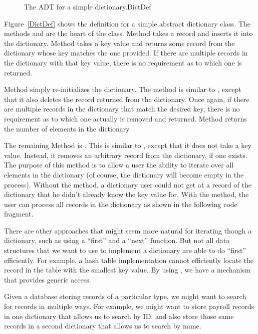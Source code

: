 \begin{figure}

{The ADT for a simple dictionary.}{DictDef}
\end{figure}

Figure~\ref{DictDef} shows the definition for a simple abstract
dictionary class.
The methods  and  are the heart of the
class.
Method  takes a record and
inserts it into the dictionary.
Method  takes a key value and returns some record from
the dictionary whose key matches the one provided.
If there are multiple records in the dictionary with that key value,
there is no requirement as to which one is returned.

Method  simply re-initializes the dictionary.
The  method is similar to , except that it
also deletes the record returned from the dictionary.
Once again, if there are multiple records in the dictionary that match
the desired key, there is no requirement as to which one actually is
removed and returned.
Method  returns the number of elements in the
dictionary.

The remaining Method is .
This is similar to , except that it does not take a key
value.
Instead, it removes an arbitrary record from the dictionary, if one
exists.
The purpose of this method is to allow a user the ability to iterate 
over all elements in the dictionary (of course, the dictionary will
become empty in the process).
Without the  method, a dictionary user could not get
at a record of the dictionary that he didn't already know the key
value for.
With the  method, the user can process all records
in the dictionary as shown in the following code fragment.


There are other approaches that might seem more natural for iterating
though a dictionary, such as using a ``first'' and a ``next'' function.
But not all data structures that we want to use to implement a
dictionary are able to do ``first'' efficiently.
For example, a hash table implementation cannot efficiently locate the
record in the table with the smallest key value.
By using , we have a mechanism that provides generic
access.

Given a database storing records of a particular type,
we might want to search for records in multiple ways.
For example, we might want to store payroll records in one dictionary
that allows us to search by ID,
and also store those same records in a second dictionary that
allows us to search by name.

